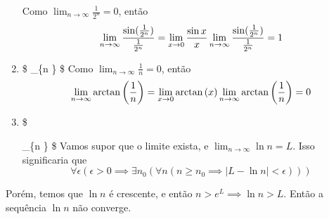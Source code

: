 \begin{enumerate}
  Como \(\lim_{n \to \infty} \frac{1}{2^n} = 0\), então \[
  \lim_{n \to \infty}
  \dfrac{\sin(\frac{1}{2^n})}
  {\frac{1}{2^n}} = 
  \lim_{x \to 0} \dfrac{\sin{x}}{x}\\
  \lim_{n \to \infty}
  \dfrac{\sin(\frac{1}{2^n})}
  {\frac{1}{2^n}} = 1
  \]
\item
  \$ \lim\_\{n \to \infty\}  \$ Como
  \(\lim_{n \to \infty} \frac{1}{n} = 0\), então \[
  \lim_{n \to \infty}
  \arctan{
  \left(\dfrac{1}{n}\right)
  }
  = 
  \lim_{x \to 0} \arctan{(x)}\\
  \lim_{n \to \infty}
  \arctan{
  \left(\dfrac{1}{n}\right)
  }
  =0
  \]
\item
  \$

  \lim\_\{n \to \infty\}  \$ Vamos supor que o limite exista, e
  \(\lim_{n \to \infty}\ln{n} = L\). Isso significaria que \[
  \forall \epsilon(\epsilon > 0 \implies \exists n_0(\forall n(n \geq n_0 \implies |L - \ln n| < \epsilon)))
  \]
\end{enumerate}

Porém, temos que \(\ln n\) é crescente, e então
\(n > e^L \implies \ln n > L\). Então a sequência \(\ln n\) não
converge.
